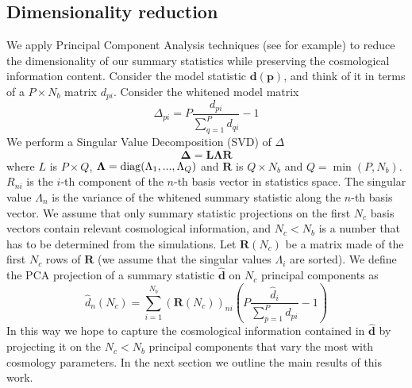 \documentclass[reprint,aps,prd,superscriptaddress,showkeys,showpacs]{revtex4-1}
\newcommand{\bb}[1]{\mathbf{#1}}
\newcommand{\bbh}[1]{\mathbf{\hat{#1}}}
\newcommand{\h}[1]{\hat{#1}}
\begin{document}
\subsection{Dimensionality reduction}
We apply Principal Component Analysis techniques (see \citep{astroMLText} for example) to reduce the dimensionality of our summary statistics while preserving the cosmological information content. Consider the model statistic $\bb{d}(\bb{p})$, and think of it in terms of a $P\times N_b$ matrix $d_{pi}$. Consider the whitened model matrix
\begin{equation}
\Delta_{pi} = P\frac{d_{pi}}{\sum_{q=1}^Pd_{qi}} - 1
\end{equation} 
%
We perform a Singular Value Decomposition (SVD) of $\Delta$ 
\begin{equation}
\bb\Delta = \bb{L}\bb{\Lambda} \bb{R}
\end{equation}
%
where $L$ is $P\times Q$, $\bb{\Lambda}={\rm diag}(\Lambda_1,...,\Lambda_Q)$ and $\bb{R}$ is $Q\times N_b$ and $Q={\min}(P,N_b)$. $R_{ni}$ is the $i$-th component of the $n$-th basis vector in statistics space. The singular value $\Lambda_n$ is the variance of the whitened summary statistic along the $n$-th basis vector. We assume that only summary statistic projections on the first $N_c$ basis vectors contain relevant cosmological information, and $N_c<N_b$ is a number that has to be determined from the simulations. Let $\bb{R}(N_c)$ be a matrix made of the first $N_c$ rows of $\bb{R}$ (we assume that the singular values $\Lambda_i$ are sorted). We define the PCA projection of a summary statistic $\bbh{d}$ on $N_c$ principal components as 
\begin{equation}
\label{meth:pcaprojection}
\h{d}_n(N_c) = \sum_{i=1}^{N_b}(\bb{R}(N_c))_{ni}\left(P\frac{\h{d}_i}{\sum_{p=1}^P d_{pi}}-1\right) 
\end{equation} 
%
In this way we hope to capture the cosmological information contained in $\bbh{d}$ by projecting it on the $N_c<N_b$ principal components that vary the most with cosmology parameters. In the next section we outline the main results of this work.  
\end{document}
